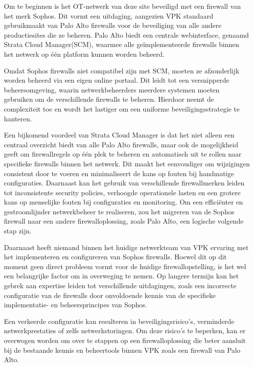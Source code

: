 Om te beginnen is het OT-netwerk van deze site beveiligd met een firewall van het merk Sophos. Dit vormt een uitdaging, aangezien VPK standaard gebruikmaakt van Palo Alto firewalls voor de beveiliging van alle andere productiesites die ze beheren. Palo Alto biedt een centrale webinterface, genaamd Strata Cloud Manager(SCM), waarmee alle geïmplementeerde firewalls binnen het netwerk op één platform kunnen worden beheerd.

Omdat Sophos firewalls niet compatibel zijn met SCM, moeten ze afzonderlijk worden beheerd via een eigen online portaal. Dit leidt tot een versnipperde beheersomgeving, waarin netwerkbeheerders meerdere systemen moeten gebruiken om de verschillende firewalls te beheren. Hierdoor neemt de complexiteit toe en wordt het lastiger om een uniforme beveiligingsstrategie te hanteren.

Een bijkomend voordeel van Strata Cloud Manager is dat het niet alleen een centraal overzicht biedt van alle Palo Alto firewalls, maar ook de mogelijkheid geeft om firewallregels op één plek te beheren en automatisch uit te rollen naar specifieke firewalls binnen het netwerk. Dit maakt het eenvoudiger om wijzigingen consistent door te voeren en minimaliseert de kans op fouten bij handmatige configuraties.
Daarnaast kan het gebruik van verschillende firewallmerken leiden tot inconsistente security policies, verhoogde operationele lasten en een grotere kans op menselijke fouten bij configuraties en monitoring. Om een efficiënter en gestroomlijnder netwerkbeheer te realiseren, zou het migreren van de Sophos firewall naar een andere firewalloplossing, zoals Palo Alto, een logische volgende stap zijn.

Daarnaast heeft niemand binnen het huidige netwerkteam van VPK ervaring met het implementeren en configureren van Sophos firewalls. Hoewel dit op dit moment geen direct probleem vormt voor de huidige firewallopstelling, is het wel een belangrijke factor om in overweging te nemen. Op langere termijn kan het gebrek aan expertise leiden tot verschillende uitdagingen, zoals een incorrecte configuratie van de firewalls door onvoldoende kennis van de specifieke implementatie- en beheersprincipes van Sophos.

Een verkeerde configuratie kan resulteren in beveiligingsrisico’s, verminderde netwerkprestaties of zelfs netwerkstoringen. Om deze risico’s te beperken, kan er overwogen worden om over te stappen op een firewalloplossing die beter aansluit bij de bestaande kennis en beheertools binnen VPK zoals een firewall van Palo Alto.\newline

